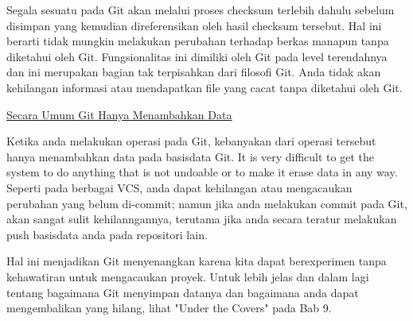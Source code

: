 \par
\noindent 
{\fontsize{14pt}{14pt}\selectfont Segala sesuatu pada Git akan melalui proses checksum terlebih dahulu sebelum disimpan yang kemudian direferensikan oleh hasil checksum tersebut. Hal ini berarti tidak mungkin melakukan perubahan terhadap berkas manapun tanpa diketahui oleh Git. Fungsionalitas ini dimiliki oleh Git pada level terendahnya dan ini merupakan bagian tak terpisahkan dari filosofi Git. Anda tidak akan kehilangan informasi atau mendapatkan file yang cacat tanpa diketahui oleh Git. \\} \par
\vspace{14pt}
\vspace{14pt}
\vspace{12pt}
\vspace{12pt}
\noindent 
{\fontsize{14pt}{14pt}\selectfont \underline{Secara Umum Git Hanya Menambahkan Data} \\} \par
\noindent 
{\fontsize{14pt}{14pt}\selectfont Ketika anda melakukan operasi pada Git, kebanyakan dari operasi tersebut hanya menambahkan data pada basisdata Git. It is very difficult to get the system to do anything that is not undoable or to make it erase data in any way. Seperti pada berbagai VCS, anda dapat kehilangan atau mengacaukan perubahan yang belum di-commit; namun jika anda melakukan commit pada Git, akan sangat sulit kehilanngannya, terutama jika anda secara teratur melakukan push basisdata anda pada repositori lain. \\} \par
\noindent 
{\fontsize{14pt}{14pt}\selectfont Hal ini menjadikan Git menyenangkan karena kita dapat berexperimen tanpa kehawatiran untuk mengacaukan proyek. Untuk lebih jelas dan dalam lagi tentang bagaimana Git menyimpan datanya dan bagaimana anda dapat mengembalikan yang hilang, lihat "Under the Covers" pada Bab 9. \\} \par

